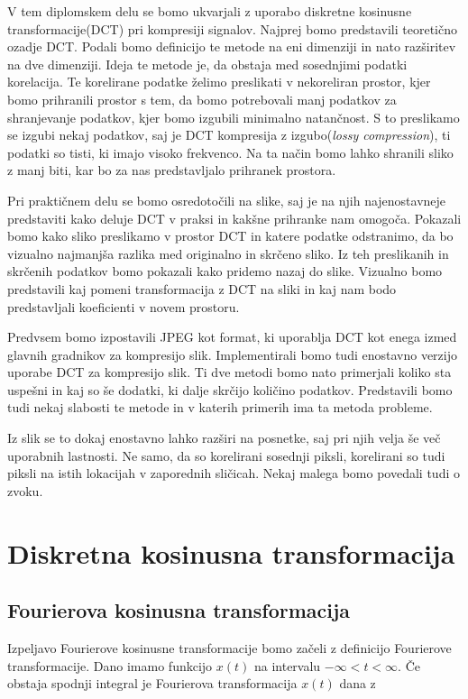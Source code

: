 \documentclass[a4paper,12pt,openright]{book}
\begin{document}
V tem diplomskem delu se bomo ukvarjali z uporabo diskretne kosinusne transformacije(DCT) pri kompresiji signalov. Najprej bomo predstavili teoretično ozadje DCT. Podali bomo definicijo te metode na eni dimenziji in nato razširitev na dve dimenziji. Ideja te metode je, da obstaja med sosednjimi podatki korelacija. Te korelirane podatke želimo preslikati v nekoreliran prostor, kjer bomo prihranili prostor s tem, da bomo potrebovali manj podatkov za shranjevanje podatkov, kjer bomo izgubili minimalno natančnost. S to preslikamo se izgubi nekaj podatkov, saj je DCT kompresija z izgubo(\textit{lossy compression}), ti podatki so tisti, ki imajo visoko frekvenco. Na ta način bomo lahko shranili sliko z manj biti, kar bo za nas predstavljalo prihranek prostora.\par 
Pri praktičnem delu se bomo osredotočili na slike, saj je na njih najenostavneje predstaviti kako deluje DCT v praksi in kakšne prihranke nam omogoča. Pokazali bomo kako sliko preslikamo v prostor DCT in katere podatke odstranimo, da bo vizualno najmanjša razlika med originalno in skrčeno sliko. Iz teh preslikanih in skrčenih podatkov bomo pokazali kako pridemo nazaj do slike. Vizualno bomo predstavili kaj pomeni transformacija z DCT na sliki in kaj nam bodo predstavljali koeficienti v novem prostoru. \par
Predvsem bomo izpostavili JPEG kot format, ki uporablja DCT kot enega izmed glavnih gradnikov za kompresijo slik. Implementirali bomo tudi enostavno verzijo uporabe DCT za kompresijo slik. Ti dve metodi bomo nato primerjali koliko sta uspešni in kaj so še dodatki, ki dalje skrčijo količino podatkov. Predstavili bomo tudi nekaj slabosti te metode in v katerih primerih ima ta metoda probleme. \par
Iz slik se to dokaj enostavno lahko razširi na posnetke, saj pri njih velja še več uporabnih lastnosti. Ne samo, da so korelirani sosednji piksli, korelirani so tudi piksli na istih lokacijah v zaporednih sličicah. Nekaj malega bomo povedali tudi o zvoku.


\chapter{Diskretna kosinusna transformacija} 
\label{DCT}

\section{Fourierova kosinusna transformacija}%
Izpeljavo Fourierove kosinusne transformacije bomo začeli z definicijo Fourierove transformacije. Dano imamo funkcijo \(x(t)\) na intervalu \(-\infty < t < \infty\). Če obstaja spodnji integral je Fourierova transformacija \(x(t)\) dana z
\end{document}
